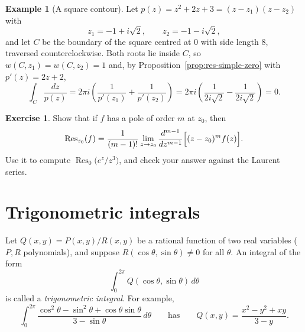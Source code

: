 \documentclass[11pt]{article}
\theoremstyle{plain}
\theoremstyle{definition}
\newtheorem{example}[theorem]{Example}
\newtheorem{exercise}[theorem]{Exercise}
\theoremstyle{boldremark}
\theoremstyle{remark}
\numberwithin{equation}{section}
\newenvironment{lecturefigure}
 {\par\addvspace{0.25em}\begingroup\setlength{\parskip}{0pt}\centering}
 {\par\endgroup\addvspace{0.25em}}
\begin{document}
\begin{example}[A square contour]
Let $p(z)=z^2+2z+3=(z-z_1)(z-z_2)$ with
\[
 z_1=-1+i\sqrt2,\qquad z_2=-1-i\sqrt2,
\]
and let $C$ be the boundary of the square centred at $0$ with side
length $8$, traversed counterclockwise. Both roots lie inside $C$, so
$w(C,z_1)=w(C,z_2)=1$ and, by Proposition~\ref{prop:res-simple-zero} with
$p'(z)=2z+2$,
\[
 \int_C\frac{dz}{p(z)}
 =2\pi i\left(\frac{1}{p'(z_1)}+\frac{1}{p'(z_2)}\right)
 =2\pi i\left(\frac{1}{2i\sqrt2}-\frac{1}{2i\sqrt2}\right)=0.
\]
\begin{lecturefigure}
\end{lecturefigure}
\end{example}

\begin{exercise}
Show that if $f$ has a pole of order $m$ at $z_0$, then
\[
 \operatorname{Res}_{z_0}(f)=\frac{1}{(m-1)!}\lim_{z\to z_0}
 \frac{d^{m-1}}{dz^{m-1}}\Bigl[(z-z_0)^mf(z)\Bigr].
\]
Use it to compute $\operatorname{Res}_0\bigl(e^z/z^3\bigr)$, and check your
answer against the Laurent series.
\end{exercise}

\section{Trigonometric integrals}
\enlargethispage{\baselineskip}
\begingroup
\setlength{\abovedisplayskip}{7pt plus 2pt minus 2pt}
\setlength{\belowdisplayskip}{7pt plus 2pt minus 2pt}
Let $Q(x,y)=P(x,y)/R(x,y)$ be a rational function of two real variables
($P,R$ polynomials), and suppose $R(\cos\theta,\sin\theta)\ne0$ for all
$\theta$. An integral of the form
\[
 \int_0^{2\pi}Q(\cos\theta,\sin\theta)\,d\theta
\]
is called a \emph{trigonometric integral}. For example,
\[
 \int_0^{2\pi}\frac{\cos^2\theta-\sin^2\theta+\cos\theta\sin\theta}
 {3-\sin\theta}\,d\theta
 \qquad\text{has}\qquad
 Q(x,y)=\frac{x^2-y^2+xy}{3-y}.
\]
\end{document}
